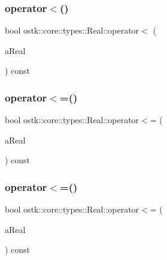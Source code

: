 \mbox{\label{classostk_1_1core_1_1types_1_1_real_aeac3bfa73156aa562496343dd5006500}} 
\subsubsection{\texorpdfstring{operator$<$()}{operator<()}\hspace{0.1cm}{\footnotesize\ttfamily [2/2]}}
{\footnotesize\ttfamily bool ostk\+::core\+::types\+::\+Real\+::operator$<$ (\begin{DoxyParamCaption}\item[{const \hyperlink{classostk_1_1core_1_1types_1_1_real_aa26f796c30b514c98d573f82e3b02296}{Real\+::\+Value\+Type} \&}]{a\+Real }\end{DoxyParamCaption}) const}

\mbox{\label{classostk_1_1core_1_1types_1_1_real_aac06c00f78bfecabfbca4fee6ed5a6a8}} 
\subsubsection{\texorpdfstring{operator$<$=()}{operator<=()}\hspace{0.1cm}{\footnotesize\ttfamily [1/2]}}
{\footnotesize\ttfamily bool ostk\+::core\+::types\+::\+Real\+::operator$<$= (\begin{DoxyParamCaption}\item[{const \hyperlink{classostk_1_1core_1_1types_1_1_real}{Real} \&}]{a\+Real }\end{DoxyParamCaption}) const}

\mbox{\label{classostk_1_1core_1_1types_1_1_real_aeff2c70386289260a6b756edd7ccb4ed}} 
\subsubsection{\texorpdfstring{operator$<$=()}{operator<=()}\hspace{0.1cm}{\footnotesize\ttfamily [2/2]}}
{\footnotesize\ttfamily bool ostk\+::core\+::types\+::\+Real\+::operator$<$= (\begin{DoxyParamCaption}\item[{const \hyperlink{classostk_1_1core_1_1types_1_1_real_aa26f796c30b514c98d573f82e3b02296}{Real\+::\+Value\+Type} \&}]{a\+Real }\end{DoxyParamCaption}) const}

